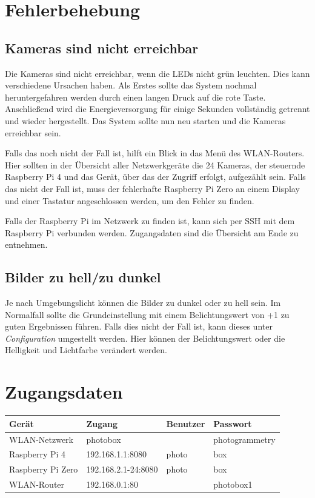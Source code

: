 \documentclass[./00PhotoBox.tex]{subfiles}
\begin{document}
\section{Fehlerbehebung}
\label{sec:Fehlerbehebung}
\subsection{Kameras sind nicht erreichbar}
Die Kameras sind nicht erreichbar, wenn die LEDs nicht grün leuchten. Dies kann verschiedene Ursachen haben. Als Erstes sollte das System nochmal heruntergefahren werden durch einen langen Druck auf die rote Taste. Anschließend wird die Energieversorgung für einige Sekunden vollständig getrennt und wieder hergestellt. Das System sollte nun neu starten und die Kameras erreichbar sein.

Falls das noch nicht der Fall ist, hilft ein Blick in das Menü des WLAN-Routers. Hier sollten in der Übersicht aller Netzwerkgeräte die 24 Kameras, der steuernde Raspberry Pi 4 und das Gerät, über das der Zugriff erfolgt, aufgezählt sein. Falls das nicht der Fall ist, muss der fehlerhafte Raspberry Pi Zero an einem Display und einer Tastatur angeschlossen werden, um den Fehler zu finden.

Falls der Raspberry Pi im Netzwerk zu finden ist, kann sich per SSH mit dem Raspberry Pi verbunden werden. Zugangsdaten sind die Übersicht am Ende zu entnehmen.

\subsection{Bilder zu hell/zu dunkel}
Je nach Umgebungslicht können die Bilder zu dunkel oder zu hell sein. Im Normalfall sollte die Grundeinstellung mit einem Belichtungswert von +1 zu guten Ergebnissen führen. Falls dies nicht der Fall ist, kann dieses unter \textit{\foreignlanguage{british}{Configuration}} umgestellt werden. Hier können der Belichtungswert oder die Helligkeit und Lichtfarbe verändert werden.


\section{Zugangsdaten}

\begin{tabular}{|l|l|l|l|}
    \hline
    \textbf{Gerät}    & \textbf{Zugang}     & \textbf{Benutzer} & \textbf{Passwort} \\
    \hline
    WLAN-Netzwerk     & photobox            &                   & photogrammetry    \\
    \hline
    Raspberry Pi 4    & 192.168.1.1:8080    & photo             & box               \\
    \hline
    Raspberry Pi Zero & 192.168.2.1-24:8080 & photo             & box               \\
    \hline
    WLAN-Router       & 192.168.0.1:80      &                   & photobox1         \\
    \hline
\end{tabular}

\biblio
\end{document}
